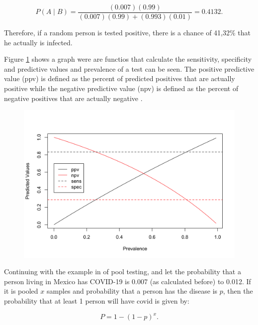 \documentclass[10pt,leter,openany]{article}
\begin{document}
	\begin{equation*}
		P(A \mid B)  = \dfrac{(0.007)(0.99)}{(0.007)(0.99) + (0.993)(0.01)} = 0.4132.
	\end{equation*}

	Therefore, if a random person is tested positive, there is a chance of 41,32\% that he actually is infected.
	
	Figure \ref{fig:prevalence} shows a graph were are functios that calculate the sensitivity, specificity and predictive values and prevalence of a test can be seen. The positive predictive value (ppv) is defined as the percent of predicted positives that are actually positive while the negative predictive value (npv) is defined as the percent of negative positives that are actually negative \citep{khun2020}.
	
		\begin{figure}
		\begin{center}
			\includegraphics[scale=0.19]{img/plot}
			\label{fig:prevalence}
		\end{center}
	\end{figure}
	
	Continuing with the example in \citet{archit2020} of pool testing, and let the probability that a person living in Mexico has COVID-19 is 0.007 (as calculated before) to 0.012. If it is pooled $ x $ samples and probability that a person has the disease is $p$, then the probability that at least 1 person will have covid is given by:
	
		\begin{equation}
		P  = 1 - (1-p)^{x}.
	\end{equation}
\end{document}
